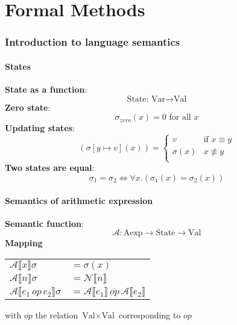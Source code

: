 \documentclass[11.5pt]{article}
\def\li{\rightarrow}
\def\fax{\forall x.}
\def\A{\mathcal{A}}
\def\llb{\llbracket}
\def\rrb{\rrbracket}
\begin{document}
\newpage
\part*{Formal Methods}
\setcounter{section}{0}
\renewcommand*{\theHsection}{chY.\the\value{section}}

\section{Introduction to language semantics}
\subsection{States}
\textbf{State as a function}: 
$$\text{State: Var} \li \text{Val}$$ 
\textbf{Zero state}: 
$$\sigma_{zero}(x)=0\text{ for all }x$$
\textbf{Updating states}: 
$$ (\sigma[y\mapsto v](x)) = \begin{cases}
v & \text{if } x \equiv y \\
\sigma(x) & x \not\equiv y \\
\end{cases}
$$
\textbf{Two states are equal}:
$$ \sigma_1 = \sigma_2 \Leftrightarrow \fax (\sigma_1(x) = \sigma_2(x))$$

\subsection{Semantics of arithmetic expression}
\textbf{Semantic function}:
$$ \A: \text{Aexp}\li \text{State} \li \text{Val}$$
\textbf{Mapping}
\begin{center}
\begin{tabular}{l l}
    $\A \llb x\rrb \sigma$ & $= \sigma(x)$ \\
    $\A \llb n\rrb \sigma$ & $= \mathcal{N}\llb n\rrb$ \\
    $\A \llb e_1 \, op \, e_2\rrb \sigma$ & $= \A\llb e_1\rrb \, \overline{op} \, \A\llb e_2\rrb$ 
\end{tabular}
\end{center}
with $\overline{op}$ the relation $\text{Val}\times\text{Val}$ corresponding to $op$
\end{document}
